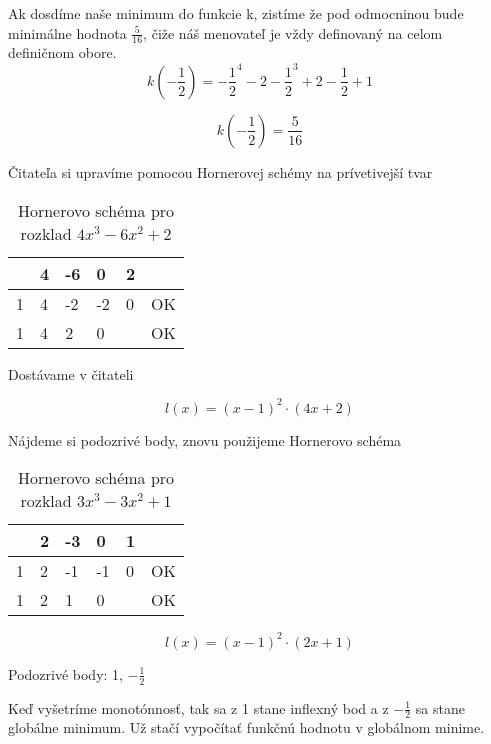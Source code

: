 Ak dosdíme naše minimum do funkcie k, zistíme že pod odmocninou bude minimálne hodnota \(\frac{5}{16}\), čiže náš menovateľ je vždy definovaný na celom definičnom obore.
\begin{displaymath}
k(-\frac{1}{2})=-\frac{1}{2}^4 -2-\frac{1}{2}^3 + 2-\frac{1}{2} + 1
\end{displaymath}

\begin{displaymath}
k(-\frac{1}{2})=\frac{5}{16}
\end{displaymath}

Čitateľa si upravíme pomocou Hornerovej schémy na prívetivejší tvar

\begin{table}[!h]
\centering
\begin{tabular}{l||l|l|l|l|l}
	 & 4 & -6 &  0 & 2 &    \\ \hline\hline
   1 & 4 & -2 & -2 & 0 & OK \\ \hline
   1 & 4 &  2 &  0 &   & OK \\
\end{tabular}
\caption{Hornerovo schéma pro rozklad $4x^3 - 6x^2 + 2$}
\end{table}

Dostávame v čitateli

\begin{displaymath}
l(x)=(x-1)^2\cdot (4x +2)
\end{displaymath}

Nájdeme si podozrivé body, znovu použijeme Hornerovo schéma

\begin{table}[!h]
\centering
\begin{tabular}{l||l|l|l|l|l}
	 & 2 & -3 &  0 & 1 &    \\ \hline\hline
   1 & 2 & -1 & -1 & 0 & OK \\ \hline
   1 & 2 &  1 &  0 &   & OK \\
\end{tabular}
\caption{Hornerovo schéma pro rozklad $3x^3 - 3x^2 + 1$}
\end{table}

\begin{displaymath}
l(x)=(x-1)^2\cdot (2x +1)
\end{displaymath}

Podozrivé body: 1, \(-\frac{1}{2}\)

Keď vyšetríme monotónnosť, tak sa z 1 stane inflexný bod a z \(-\frac{1}{2}\) sa stane globálne minimum.
Už stačí vypočítať funkčnú hodnotu v globálnom minime.

